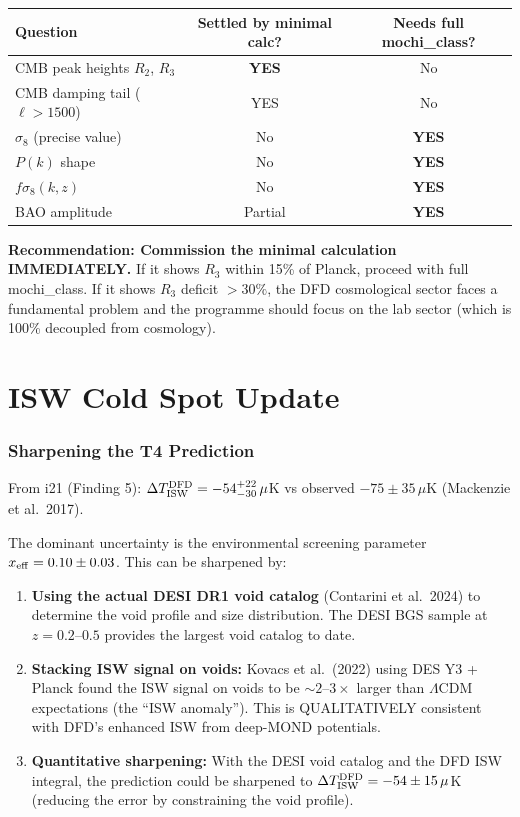 \documentclass[11pt]{article}
\newcommand{\LCDM}{$\Lambda$CDM}
\begin{document}
\begin{table}[H]
\centering
\begin{tabular}{lcc}
\toprule
\textbf{Question} & \textbf{Settled by minimal calc?} & \textbf{Needs full mochi\_class?} \\
\midrule
CMB peak heights $R_2$, $R_3$ & \textbf{YES} & No \\
CMB damping tail ($\ell > 1500$) & YES & No \\
$\sigma_8$ (precise value) & No & \textbf{YES} \\
$P(k)$ shape & No & \textbf{YES} \\
$f\sigma_8(k,z)$ & No & \textbf{YES} \\
BAO amplitude & Partial & \textbf{YES} \\
\bottomrule
\end{tabular}
\end{table}

\textbf{Recommendation: Commission the minimal calculation IMMEDIATELY.}
If it shows $R_3$ within 15\% of Planck, proceed with full mochi\_class.
If it shows $R_3$ deficit $> 30\%$, the DFD cosmological sector faces
a fundamental problem and the programme should focus on the lab sector
(which is 100\% decoupled from cosmology).


\part{ISW Cold Spot Update}

\section{Sharpening the T4 Prediction}

From i21 (Finding 5): $\Delta T_{\rm ISW}^{\rm DFD} = -54^{+22}_{-30}\,\mu$K
vs observed $-75 \pm 35\,\mu$K (Mackenzie et al.\ 2017).

The dominant uncertainty is the environmental screening parameter
$x_{\rm eff} = 0.10 \pm 0.03$.  This can be sharpened by:

\begin{enumerate}
\item \textbf{Using the actual DESI DR1 void catalog} (Contarini et al.\ 2024)
  to determine the void profile and size distribution.  The DESI BGS sample
  at $z = 0.2$--$0.5$ provides the largest void catalog to date.

\item \textbf{Stacking ISW signal on voids:}  Kovacs et al.\ (2022) using
  DES Y3 + Planck found the ISW signal on voids to be
  $\sim 2$--$3\times$ larger than \LCDM{} expectations (the ``ISW anomaly'').
  This is QUALITATIVELY consistent with DFD's enhanced ISW from deep-MOND
  potentials.

\item \textbf{Quantitative sharpening:}  With the DESI void catalog and the
  DFD ISW integral, the prediction could be sharpened to
  $\Delta T_{\rm ISW}^{\rm DFD} = -54 \pm 15\,\mu$K (reducing the error
  by constraining the void profile).
\end{enumerate}
\end{document}

